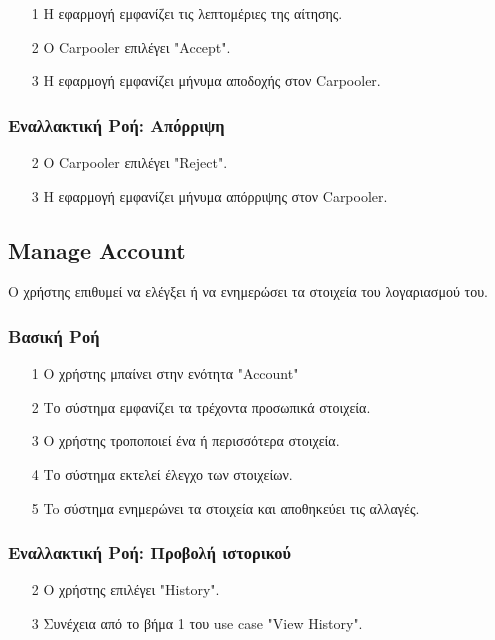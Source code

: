 \begin{enumerate}
    \item[1] Η εφαρμογή εμφανίζει τις λεπτομέριες της αίτησης.
    \item[2] Ο Carpooler επιλέγει "Accept".
    \item[3] Η εφαρμογή εμφανίζει μήνυμα αποδοχής στον Carpooler.
\end{enumerate}

\subsubsection{Εναλλακτική Ροή: Απόρριψη}

\begin{enumerate}
   \item[2] Ο Carpooler επιλέγει "Reject".
   \item[3] Η εφαρμογή εμφανίζει μήνυμα απόρριψης στον Carpooler.
\end{enumerate}

\subsection{Manage Account}
\label{uc:manage-account}

Ο χρήστης επιθυμεί να ελέγξει ή να ενημερώσει τα στοιχεία του λογαριασμού του.

\subsubsection{Βασική Ροή}

\begin{enumerate}
    \item[1] Ο χρήστης μπαίνει στην ενότητα "Account"
    \item[2] Το σύστημα εμφανίζει τα τρέχοντα προσωπικά στοιχεία.
    \item[3] Ο χρήστης τροποποιεί ένα ή περισσότερα στοιχεία.
    \item[4] Το σύστημα εκτελεί έλεγχο των στοιχείων.
    \item[5] To σύστημα ενημερώνει τα στοιχεία και αποθηκεύει τις αλλαγές.
\end{enumerate}

\subsubsection{Εναλλακτική Ροή: Προβολή ιστορικού}

\begin{enumerate}
    \item[2] Ο χρήστης επιλέγει "History".
    \item[3] Συνέχεια από το βήμα 1 του use case "View History".
\end{enumerate}


